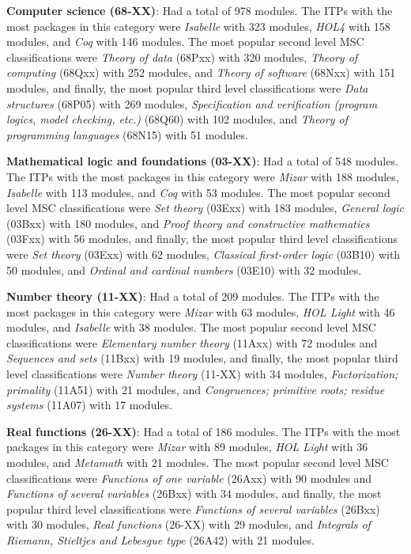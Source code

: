 \documentclass[
]{article}
\begin{document}
\textbf{Computer science (68-XX)}: Had a total of 978 modules. The ITPs
with the most packages in this category were \emph{Isabelle} with 323
modules, \emph{HOL4} with 158 modules, and \emph{Coq} with 146 modules.
The most popular second level MSC classifications were \emph{Theory of
data} (68Pxx) with 320 modules, \emph{Theory of computing} (68Qxx) with
252 modules, and \emph{Theory of software} (68Nxx) with 151 modules, and
finally, the most popular third level classifications were \emph{Data
structures} (68P05) with 269 modules, \emph{Specification and
verification (program logics, model checking, etc.) } (68Q60) with 102
modules, and \emph{Theory of programming languages} (68N15) with 51
modules.

\textbf{Mathematical logic and foundations (03-XX)}: Had a total of 548
modules. The ITPs with the most packages in this category were
\emph{Mizar} with 188 modules, \emph{Isabelle} with 113 modules, and
\emph{Coq} with 53 modules. The most popular second level MSC
classifications were \emph{Set theory} (03Exx) with 183 modules,
\emph{General logic} (03Bxx) with 180 modules, and \emph{Proof theory
and constructive mathematics} (03Fxx) with 56 modules, and finally, the
most popular third level classifications were \emph{Set theory} (03Exx)
with 62 modules, \emph{Classical first-order logic} (03B10) with 50
modules, and \emph{Ordinal and cardinal numbers} (03E10) with 32
modules.

\textbf{Number theory (11-XX)}: Had a total of 209 modules. The ITPs
with the most packages in this category were \emph{Mizar} with 63
modules, \emph{HOL Light} with 46 modules, and \emph{Isabelle} with 38
modules. The most popular second level MSC classifications were
\emph{Elementary number theory } (11Axx) with 72 modules and
\emph{Sequences and sets} (11Bxx) with 19 modules, and finally, the most
popular third level classifications were \emph{Number theory} (11-XX)
with 34 modules, \emph{Factorization; primality} (11A51) with 21
modules, and \emph{Congruences; primitive roots; residue systems}
(11A07) with 17 modules.

\textbf{Real functions (26-XX)}: Had a total of 186 modules. The ITPs
with the most packages in this category were \emph{Mizar} with 89
modules, \emph{HOL Light} with 36 modules, and \emph{Metamath} with 21
modules. The most popular second level MSC classifications were
\emph{Functions of one variable} (26Axx) with 90 modules and
\emph{Functions of several variables} (26Bxx) with 34 modules, and
finally, the most popular third level classifications were
\emph{Functions of several variables} (26Bxx) with 30 modules,
\emph{Real functions} (26-XX) with 29 modules, and \emph{Integrals of
Riemann, Stieltjes and Lebesgue type } (26A42) with 21 modules.
\end{document}
